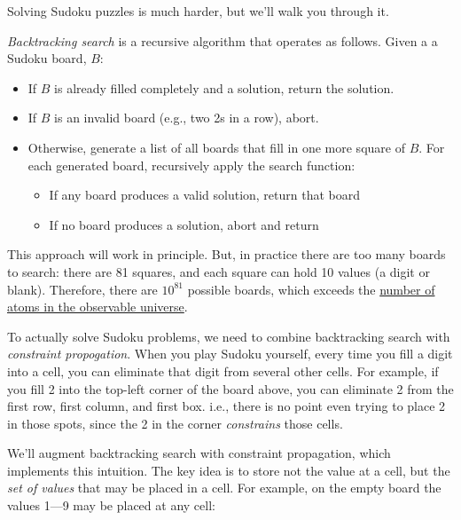 \documentclass{book}
\begin{document}
Solving Sudoku puzzles is much harder, but we'll walk you through it.

\emph{Backtracking search} is a recursive algorithm that operates as
follows. Given a a Sudoku board, $B$:

\begin{itemize}
\item If $B$ is already filled completely and a solution, return the solution.
\item If $B$ is an invalid board (e.g., two 2s in a row), abort.
\item Otherwise, generate a list of all boards that fill in one more square of
  $B$. For each generated board, recursively apply the search function:
  \begin{itemize}
  \item If any board produces a valid solution, return that board
  \item If no board produces a solution, abort and return
  \end{itemize}
\end{itemize}


This approach will work in principle. But, in practice there are too many
boards to search: there are 81 squares, and each square can hold 10 values
(a digit or blank). Therefore, there are $10^{81}$ possible boards, which
exceeds the
\href{http://en.wikipedia.org/wiki/Observable_universe#Matter_content_.E2.80.94_number_of_atoms}{number of atoms in the observable universe}.

To actually solve Sudoku problems, we need to combine backtracking search
with \emph{constraint propogation}. When you play Sudoku yourself, every
time you fill a digit into a cell, you can eliminate that digit from
several other cells. For example, if you fill 2 into the top-left corner
of the board above, you can eliminate 2 from the first row, first column,
and first box. i.e., there is no point even trying to place 2 in those
spots, since the 2 in the corner \emph{constrains} those cells.


We'll augment backtracking search with constraint propagation, which
implements this intuition. The key idea is to store not the value at a
cell, but the \emph{set of values} that may be placed in a cell. For
example, on the empty board the values 1---9 may be placed at any cell:
\end{document}
